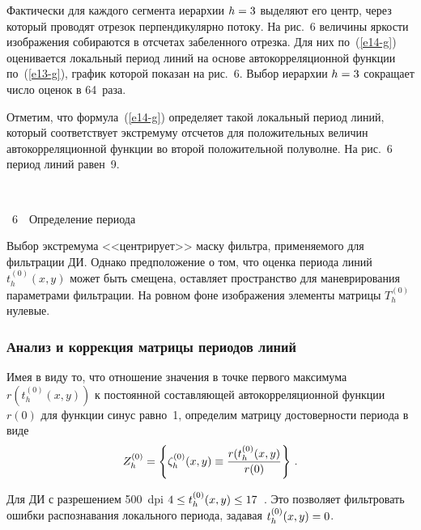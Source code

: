 \begin{multicols}{2}
  Фактически для каждого сегмента иерархии $h\hm=3$ выделяют его центр, 
через который проводят отрезок перпендикулярно потоку. На рис.~6 величины 
яркости изображения собираются в отсчетах забеленного отрезка. Для них 
по~(\ref{e14-g}) оценивается локальный период линий на основе 
автокорреляционной функции по~(\ref{e13-g}), график которой показан на 
рис.~6. Выбор иерархии $h\hm=3$ сокращает число оценок в 64~раза.
  
  Отметим, что формула~(\ref{e14-g}) определяет такой локальный период 
линий, который соответствует экстремуму отсчетов для положительных 
величин автокорреляционной функции во второй положительной полуволне. 
На рис.~6 период линий равен~9.
\begin{center} %
\vspace*{3pt}
\mbox{%
 \epsfxsize=72.704mm
}
\end{center}
\begin{center}
\vspace*{3pt}
{{\figurename~6}\ \ \small{Определение периода}}
\end{center}
\vspace*{9pt}

\addtocounter{figure}{1}

\noindent
 Выбор экстремума <<центрирует>> маску 
фильт\-ра, применяемого для фильтрации ДИ. Однако предположение о том, что 
оценка периода линий $t_h^{(0)}(x,y)$ может быть смещена, оставляет 
пространство для маневрирования параметрами фильтрации. На ровном фоне 
изображения элементы мат\-ри\-цы $T_h^{(0)}$ нулевые.


  \subsubsection*{Анализ и коррекция матрицы периодов линий}
  
  Имея в виду то, что 
отношение значения в точке первого максимума $r(t_h^{(0)}(x,y))$ к 
постоянной составляющей автокорреляционной функции~$r(0)$ для функции 
синус равно~1, определим матрицу достоверности периода в виде
  \begin{equation}
  Z_h^{(0)} =\left\{ \zeta_h^{(0)}(x,y)\equiv \displaystyle\frac{\displaystyle r(t_h^{(0)}(x,y)\mathstrut}{\displaystyle r(0)\mathstrut}\right\}\,.
  \label{e15-g}
  \end{equation}
  
  Для ДИ с разрешением 500~dpi $4\leq t_h^{(0)}(x,y)\hm\leq 17$~\cite{1-g}. 
Это позволяет фильтровать ошибки распознавания локального периода, задавая 
$t_h^{(0)}(x,y)\hm=0$.
  

\end{multicols}
